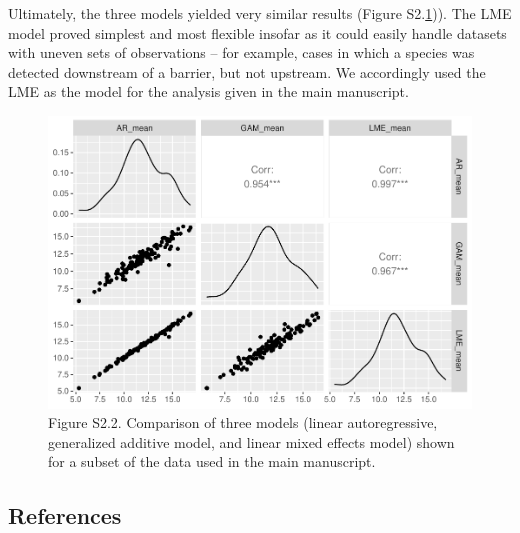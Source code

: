 \documentclass[
]{article}
\begin{document}
Ultimately, the three models yielded very similar results (Figure
S2.\ref{fig:comparemodels})). The LME model proved simplest and most
flexible insofar as it could easily handle datasets with uneven sets of
observations -- for example, cases in which a species was detected
downstream of a barrier, but not upstream. We accordingly used the LME
as the model for the analysis given in the main manuscript.

\begin{figure}
\centering
\includegraphics{../Output/SupplementalFigures/stats_comparisonplot.pdf}
\caption{Figure S2.2. Comparison of three models (linear autoregressive,
generalized additive model, and linear mixed effects model) shown for a
subset of the data used in the main
manuscript.\label{fig:comparemodels}}
\end{figure}

\hypertarget{references}{%
\subsection*{References}\label{references}}
\end{document}
